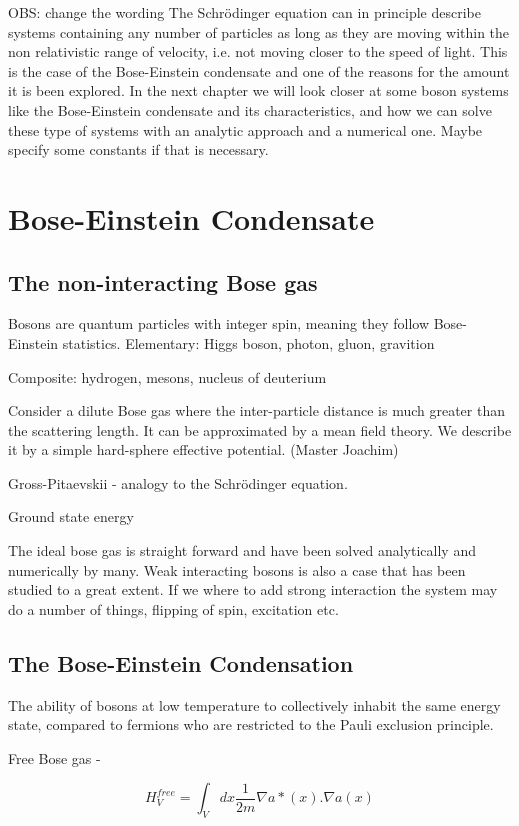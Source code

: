 OBS: change the wording
The Schrödinger equation can in principle describe systems containing any number of particles as long as they are moving within the non relativistic range of velocity, i.e. not moving closer to the speed of light. This is the case of the Bose-Einstein condensate and one of the reasons for the amount it is been explored. 
In the next chapter we will look closer at some boson systems like the Bose-Einstein condensate and its characteristics, and how we can solve these type of systems with an analytic approach and a numerical one. 
Maybe specify some constants if that is necessary. 

\section{Bose-Einstein Condensate}
\subsection{The non-interacting Bose gas}
Bosons are quantum particles with integer spin, meaning they follow Bose-Einstein statistics. 
Elementary: Higgs boson, photon, gluon, gravition

Composite: hydrogen, mesons, nucleus of deuterium

Consider a dilute Bose gas where the inter-particle distance is much greater than the scattering length. It can be approximated by a mean field theory. We describe it by a simple hard-sphere effective potential. (Master Joachim)

Gross-Pitaevskii - analogy to the Schrödinger equation. 

Ground state energy

The ideal bose gas is straight forward and have been solved analytically and numerically by many. Weak interacting bosons is also a case that has been studied to a great extent. If we where to add strong interaction the system may do a number of things, flipping of spin, excitation etc.


\subsection{The Bose-Einstein Condensation}
The ability of bosons at low temperature to collectively inhabit the same energy state, compared to fermions who are restricted to the Pauli exclusion principle.

Free Bose gas - 

\begin{equation} \label{eq:hamilt_free_bose_gas}
H^{free}_V = \int_V dx \frac{1}{2m} \nabla a*(x). \nabla a(x)
\end{equation}

